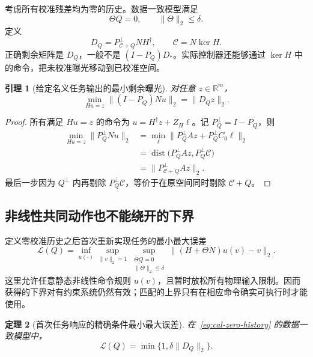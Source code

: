 \documentclass[11pt,a4paper]{article}
\numberwithin{equation}{section}
\newtheorem{theorem}{定理}[section]
\newtheorem{lemma}[theorem]{引理}
\theoremstyle{definition}
\begin{document}
考虑所有校准残差均为零的历史。数据一致模型满足
\begin{equation}
  \Theta Q=0,\qquad \|\Theta\|_2\le\delta .
  \label{eq:cal-zero-history}
\end{equation}
定义
\begin{equation}
  D_Q=P_{\mathcal C+Q}^{\perp}NH^\dagger,
  \qquad \mathcal C=N\ker H .
  \label{eq:cal-DQ}
\end{equation}
正确剩余矩阵是 $D_Q$，一般不是 $(I-P_Q)D_*$。实际控制器还能够通过 $\ker H$ 中的命令，把未校准曝光移动到已校准空间。

\begin{lemma}[给定名义任务输出的最小剩余曝光]
\label{lem:cal-DQ}
对任意 $z\in\mathbb R^m$，
\begin{equation}
  \min_{Hu=z}\|(I-P_Q)Nu\|_2
  =\|D_Qz\|_2 .
  \label{eq:cal-exposure-z}
\end{equation}
\end{lemma}

\begin{proof}
所有满足 $Hu=z$ 的命令为 $u=H^\dagger z+Z_H\ell$。记 $P_Q^\perp=I-P_Q$，则
\begin{align}
  \min_{Hu=z}\|P_Q^\perp Nu\|_2
  &=
  \min_\ell
  \|P_Q^\perp Az+P_Q^\perp C_0\ell\|_2\\
  &=
  \operatorname{dist}
  \big(P_Q^\perp Az,P_Q^\perp\mathcal C\big)\\
  &=\|P_{\mathcal C+Q}^\perp Az\|_2 .
\end{align}
最后一步因为 $Q^\perp$ 内再剔除 $P_Q^\perp\mathcal C$，等价于在原空间同时剔除 $\mathcal C+Q$。
\end{proof}

\subsection{非线性共同动作也不能绕开的下界}

定义零校准历史之后首次重新实现任务的最小最大误差
\begin{equation}
  \mathcal L(Q)=
  \inf_{u(\cdot)}
  \sup_{\|v\|_2=1}
  \sup_{\substack{\Theta Q=0\\\|\Theta\|_2\le\delta}}
  \|(H+\Theta N)u(v)-v\|_2 .
  \label{eq:cal-first-loss}
\end{equation}
这里允许任意静态非线性命令规则 $u(v)$，且暂时放松所有物理输入限制。因而获得的下界对有约束系统仍然有效；匹配的上界只有在相应命令确实可执行时才能使用。

\begin{theorem}[首次任务响应的精确条件最小最大误差]
\label{thm:cal-first-loss}
在~\eqref{eq:cal-zero-history} 的数据一致模型中，
\begin{equation}
  \boxed{\mathcal L(Q)=
  \min\{1,\delta\|D_Q\|_2\}.}
  \label{eq:cal-first-exact}
\end{equation}
\end{theorem}
\end{document}
